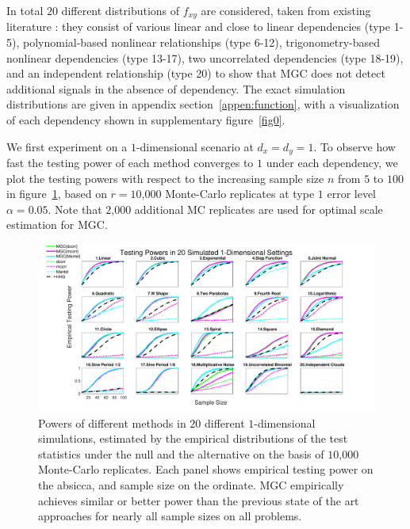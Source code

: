 \documentclass[11pt]{article}
\begin{document}
In total $20$ different distributions of $f_{xy}$ are considered, taken from existing literature \cite{SzekelyRizzoBakirov2007, SimonTibshirani2012, GorfineHellerHeller2012, HellerGorfine2013}: they consist of various linear and close to linear dependencies (type 1-5), polynomial-based nonlinear relationships (type 6-12), trigonometry-based nonlinear dependencies (type 13-17), two uncorrelated dependencies (type 18-19), and an independent relationship (type 20) to show that MGC does not detect additional signals in the absence of dependency. The exact simulation distributions are given in appendix section~\ref{appen:function}, with a visualization of each dependency shown in supplementary figure~\ref{fig0}.

We first experiment on a $1$-dimensional scenario at $d_{x}=d_{y}=1$. To observe how fast the testing power of each method converges to $1$ under each dependency, we plot the testing powers with respect to the increasing sample size $n$ from $5$ to $100$ in figure~\ref{fig:1D}, based on $r=10$,$000$ Monte-Carlo replicates at type $1$ error level $\alpha=0.05$. Note that $2$,$000$ additional MC replicates are used for optimal scale estimation for MGC. %

\begin{figure}[htbp]
\includegraphics[width=1.0\textwidth]{Figures/Fig1}
\caption{
Powers of different methods in $20$ different $1$-dimensional simulations, estimated by the empirical distributions of the test statistics under the null and the alternative on the basis of $10$,$000$ Monte-Carlo replicates.
Each panel shows empirical testing power on the absicca, and sample size on the ordinate.
MGC empirically achieves similar or better power than the previous state of the art approaches for nearly all sample sizes on all problems.}
\label{fig:1D}
\end{figure}
\end{document}
